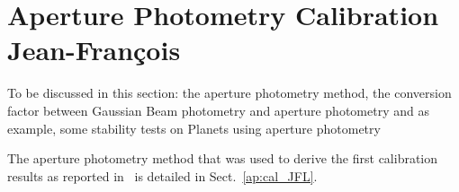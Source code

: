 \section{Aperture Photometry Calibration {\color{blue} Jean-Fran\c cois}}

To be discussed in this section: the aperture photometry method, the conversion factor between Gaussian Beam photometry and aperture photometry and as example, some stability tests on Planets using aperture photometry

The aperture photometry method that was used to derive the first calibration results as reported in~\cite{Adam18} is detailed in Sect.~\ref{ap:cal_JFL}. 
